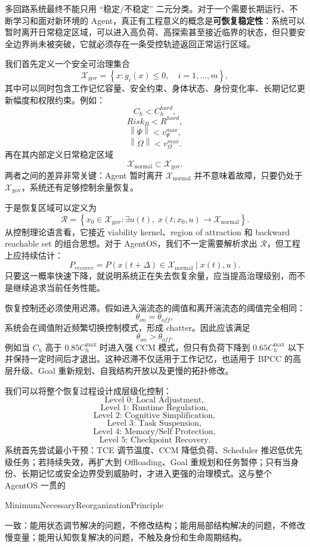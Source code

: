 多回路系统最终不能只用 ``稳定/不稳定'' 二元分类。对于一个需要长期运行、不断学习和面对新环境的 Agent，真正有工程意义的概念是\textbf{可恢复稳定性}：系统可以暂时离开日常稳定区域，可以进入高负荷、高探索甚至接近临界的状态，但只要安全边界尚未被突破，它就必须存在一条受控轨迹返回正常运行区域。

我们首先定义一个安全可治理集合
\[
\mathcal X_{\mathrm{gov}}
=
\left\{
x:
g_i(x)\leq0,
\quad i=1,\ldots,m
\right\},
\]
其中可以同时包含工作记忆容量、安全约束、身体状态、身份变化率、长期记忆更新幅度和权限约束。例如：
\[
C_h<C_h^{hard},
\]
\[
Risk_B<R^{hard},
\]
\[
\left\|\dot\Psi\right\|<v_\Psi^{max},
\]
\[
\left\|\dot\Omega\right\|<v_\Omega^{max}.
\]
再在其内部定义日常稳定区域
\[
\mathcal X_{\mathrm{normal}}
\subset
\mathcal X_{\mathrm{gov}}.
\]
两者之间的差异非常关键：Agent 暂时离开 $\mathcal X_{\mathrm{normal}}$ 并不意味着故障，只要仍处于 $\mathcal X_{\mathrm{gov}}$，系统还有足够控制余量恢复。

于是恢复区域可以定义为
\[
\mathcal R
=
\left\{
x_0\in\mathcal X_{\mathrm{gov}}
:
\exists u(t),
\;
x(t;x_0,u)
\rightarrow
\mathcal X_{\mathrm{normal}}
\right\}.
\]
从控制理论语言看，它接近 viability kernel、region of attraction 和 backward reachable set 的组合思想。对于 AgentOS，我们不一定需要解析求出 $\mathcal R$，但工程上应持续估计：
\[
P_{recover}
=
P
\left(
x(t+\Delta)\in\mathcal X_{\mathrm{normal}}
\mid x(t),u
\right).
\]
只要这一概率快速下降，就说明系统正在失去恢复余量，应当提高治理级别，而不是继续追求当前任务性能。

恢复控制还必须使用迟滞。假如进入湍流态的阈值和离开湍流态的阈值完全相同：
\[
\theta_{on}=\theta_{off},
\]
系统会在阈值附近频繁切换控制模式，形成 chatter。因此应该满足
\[
\boxed{
\theta_{on}>\theta_{off}.
}
\]
例如当 $C_h$ 高于 $0.85C_h^{\max}$ 时进入强 CCM 模式，但只有负荷下降到 $0.65C_h^{\max}$ 以下并保持一定时间后才退出。这种迟滞不仅适用于工作记忆，也适用于 BPCC 的高层升级、Goal 重新规划、自我结构开放以及更慢的拓扑修改。

我们可以将整个恢复过程设计成层级化控制：
\[
\text{Level 0: Local Adjustment},
\]
\[
\text{Level 1: Runtime Regulation},
\]
\[
\text{Level 2: Cognitive Simplification},
\]
\[
\text{Level 3: Task Suspension},
\]
\[
\text{Level 4: Memory/Self Protection},
\]
\[
\text{Level 5: Checkpoint Recovery}.
\]
系统首先尝试最小干预：TCE 调节温度、CCM 降低负荷、Scheduler 推迟低优先级任务；若持续失效，再扩大到 Offloading、Goal 重规划和任务暂停；只有当身份、长期记忆或安全边界受到威胁时，才进入更强的治理模式。这与整个 AgentOS 一贯的
\begin{statementbox}
MinimumNecessaryReorganizationPrinciple
\end{statementbox}
一致：能用状态调节解决的问题，不修改结构；能用局部结构解决的问题，不修改慢变量；能用认知恢复解决的问题，不触及身份和生命周期结构。

